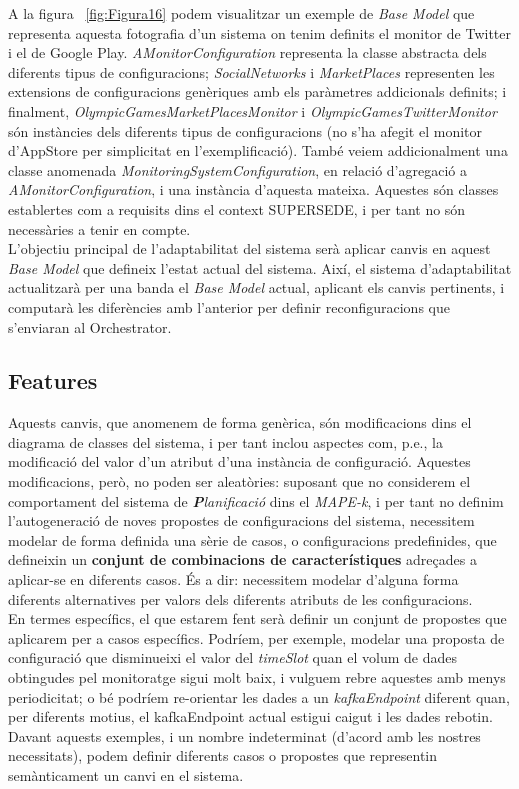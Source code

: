 A la figura ~\ref{fig:Figura16} podem visualitzar un exemple de \textit{Base Model} que representa aquesta fotografia d'un sistema on tenim definits el monitor de Twitter i el de Google Play. \textit{AMonitorConfiguration} representa la classe abstracta dels diferents tipus de configuracions; \textit{SocialNetworks} i \textit{MarketPlaces} representen les extensions de configuracions genèriques amb els paràmetres addicionals definits; i finalment, \textit{OlympicGamesMarketPlacesMonitor} i \textit{OlympicGamesTwitterMonitor} són instàncies dels diferents tipus de configuracions (no s'ha afegit el monitor d'AppStore per simplicitat en l'exemplificació). També veiem addicionalment una classe anomenada \textit{MonitoringSystemConfiguration}, en relació d'agregació a \textit{AMonitorConfiguration}, i una instància d'aquesta mateixa. Aquestes són classes establertes com a requisits dins el context SUPERSEDE, i per tant no són necessàries a tenir en compte.\\

L'objectiu principal de l'adaptabilitat del sistema serà aplicar canvis en aquest \textit{Base Model} que defineix l'estat actual del sistema. Així, el sistema d'adaptabilitat actualitzarà per una banda el \textit{Base Model} actual, aplicant els canvis pertinents, i computarà les diferències amb l'anterior per definir reconfiguracions que s'enviaran al Orchestrator.

\subsection{Features}

Aquests canvis, que anomenem de forma genèrica, són modificacions dins el diagrama de classes del sistema, i per tant inclou aspectes com, p.e., la modificació del valor d'un atribut d'una instància de configuració. Aquestes modificacions, però, no poden ser aleatòries: suposant que no considerem el comportament del sistema de \textit{\textbf{P}lanificació} dins el \textit{MAPE-k}, i per tant no definim l'autogeneració de noves propostes de configuracions del sistema, necessitem modelar de forma definida una sèrie de casos, o configuracions predefinides, que defineixin un \textbf{conjunt de combinacions de característiques} adreçades a aplicar-se en diferents casos. És a dir: necessitem modelar d'alguna forma diferents alternatives per valors dels diferents atributs de les configuracions.\\
 
En termes específics, el que estarem fent serà definir un conjunt de propostes que aplicarem per a casos específics. Podríem, per exemple, modelar una proposta de configuració que disminueixi el valor del \textit{timeSlot} quan el volum de dades obtingudes pel monitoratge sigui molt baix, i vulguem rebre aquestes amb menys periodicitat; o bé podríem re-orientar les dades a un \textit{kafkaEndpoint} diferent quan, per diferents motius, el kafkaEndpoint actual estigui caigut i les dades rebotin. Davant aquests exemples, i un nombre indeterminat (d'acord amb les nostres necessitats), podem definir diferents casos o propostes que representin semànticament un canvi en el sistema.\\

